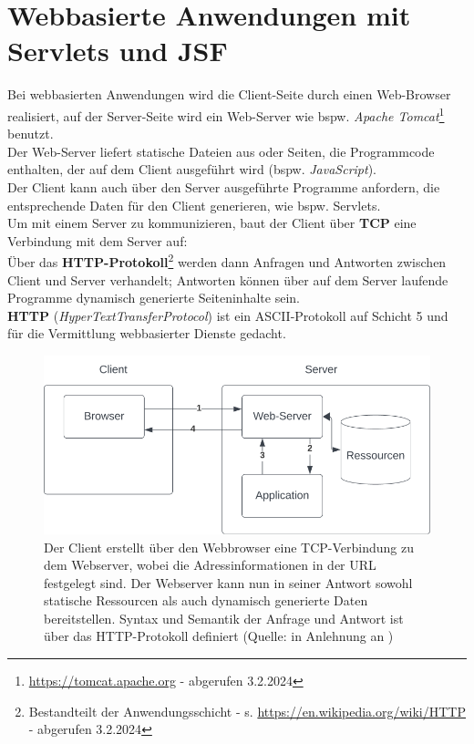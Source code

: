 \usepackage{lstmisc}\chapter{Webbasierte Anwendungen mit Servlets und JSF}

Bei webbasierten Anwendungen wird die Client-Seite durch einen Web-Browser realisiert, auf der Server-Seite wird ein Web-Server wie bspw. \textit{Apache Tomcat}\footnote{
    \url{https://tomcat.apache.org} - abgerufen 3.2.2024
} benutzt.\\

\noindent
Der Web-Server liefert statische Dateien aus oder Seiten, die Programmcode enthalten, der auf dem Client ausgeführt wird (bspw. \textit{JavaScript}).\\

\noindent
Der Client kann auch über den Server ausgeführte Programme anfordern, die entsprechende Daten für den Client generieren, wie bspw. Servlets.\\

\noindent
Um mit einem Server zu kommunizieren, baut der Client über \textbf{TCP} eine Verbindung mit dem Server auf:\\
Über das \textbf{HTTP-Protokoll}\footnote{
Bestandteilt der Anwendungsschicht - s. \url{https://en.wikipedia.org/wiki/HTTP} - abgerufen 3.2.2024
} werden dann Anfragen und Antworten zwischen Client und Server verhandelt; Antworten können über auf dem Server laufende Programme dynamisch generierte Seiteninhalte sein.\\

\noindent
\textbf{HTTP} (\textit{HyperTextTransferProtocol}) ist ein ASCII-Protokoll auf Schicht 5 und für die Vermittlung webbasierter Dienste gedacht.

\begin{figure}
    \centering
    \includegraphics[scale=0.5]{chapters/fopt6/img/clientserver}
    \caption{Der Client erstellt über den Webbrowser eine TCP-Verbindung zu dem Webserver, wobei die Adressinformationen in der URL festgelegt sind. Der Webserver kann nun in seiner Antwort sowohl statische Ressourcen als auch dynamisch generierte Daten bereitstellen. Syntax und Semantik der Anfrage und Antwort ist über das HTTP-Protokoll definiert (Quelle: in Anlehnung an \cite[402, Bild 8.1]{Oec22})}
    \label{fig:clientserver}
\end{figure}

